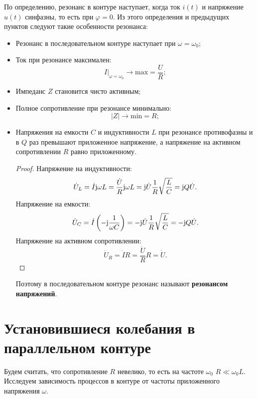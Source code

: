         По определению, резонанс в контуре наступает, когда ток \( i(t) \) и
        напряжение \( u(t) \) синфазны, то есть при \( \varphi = 0 \). Из этого
        определения и предыдущих пунктов следуют такие особенности резонанса:
        \begin{itemize}
            \item Резонанс в последовательном контуре наступает при
                \( \omega = \omega_0 \);
            \item Ток при резонансе максимален:
                \[
                    \left.I\right|_{\omega = \omega_0} \to \mathrm{max} =
                    \frac{U}{R};
                \]
            \item Импеданс \( Z \) становится чисто активным;
            \item Полное сопротивление при резонансе минимально:
                \[
                    |Z| \to \mathrm{min} = R;
                \]
            \item Напряжения на емкости \( C \) и индуктивности \( L \) при
                резонансе противофазны и в \( Q \) раз превышают приложенное
                напряжение, а напряжение на активном сопротивлении \( R \)
                равно приложенному.
        
                \begin{proof}
                    Напряжение на индуктивности:
                    \[
                        \dot{U}_L = \dot{I}\mathrm{j}\omega L =
                        \frac{\dot{U}}{R}\mathrm{j}\omega L = 
                        \mathrm{j}\dot{U}\frac{1}{R}\sqrt{\frac{L}{C}} =
                        \mathrm{j} Q\dot{U}.
                    \]
                    Напряжение на емкости:
                    \[
                        \dot{U}_C =
                        \dot{I}\left(-\mathrm{j}\frac{1}{\omega C}\right) =
                        -\mathrm{j}\dot{U}\frac{1}{R}\sqrt{\frac{L}{C}} =
                        -\mathrm{j} Q\dot{U}.
                    \]
                    Напряжение на активном сопротивлении:
                    \[
                        \dot{U}_R = \dot{I}R = \frac{\dot{U}}{R}R = \dot{U}.
                    \]
                \end{proof}
        
                Поэтому в последовательном контуре резонанс называют
                \textbf{резонансом напряжений}.
        \end{itemize}

\section{Установившиеся колебания в параллельном контуре}
    Будем считать, что сопротивление \( R \) невелико, то есть на частоте
    \( \omega_0 \) \( R \ll \omega_0L \). Исследуем зависимость процессов в
    контуре от частоты приложенного напряжения \( \omega \).

